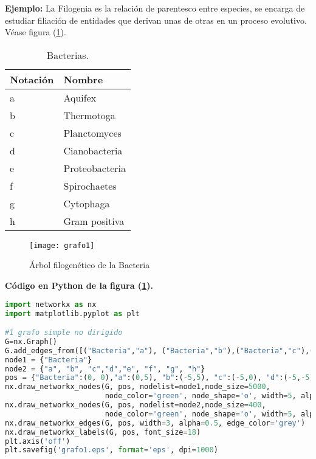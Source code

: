 \documentclass[a4paper, 11pt]{article}
\begin{document}
\textbf{Ejemplo:} La Filogenia es la relación de parentesco entre especies, se encarga de estudiar filiación de entidades que derivan unas de otras en un proceso evolutivo. Véase figura (\ref{imagen1}).


\begin{table}[H]
\begin{center}
\caption{Bacterias.}
\begin{tabular}{|l|l|}
\hline 
 Notación  &Nombre \\  \hline \hline
a &Aquifex  \\ \hline
b &Thermotoga\\ \hline
c  &Planctomyces \\ \hline
d  &Cianobacteria\\ \hline
e  &Proteobacteria \\ \hline
f  &Spirochaetes\\ \hline
g  & Cytophaga\\ \hline
h  & Gram positiva\\ \hline
\end{tabular}
\label{tabla1}
\end{center}
\end{table}

\begin{figure}[H]
  \centering
    \texttt{[image: grafo1]}
  \caption{Árbol filogenético de la Bacteria}
  \label{imagen1}
\end{figure}

\textbf{Código en Python de la figura (\ref{imagen1}).}
\begin{lstlisting}[language=Python]
import networkx as nx
import matplotlib.pyplot as plt

#1 grafo simple no dirigido
G=nx.Graph()
G.add_edges_from([("Bacteria","a"), ("Bacteria","b"),("Bacteria","c"),("Bacteria","d"),("Bacteria","e"),("Bacteria","f"),("Bacteria","g"),("Bacteria","h")])
node1 = {"Bacteria"}
node2 = {"a", "b", "c","d","e", "f", "g", "h"}
pos = {"Bacteria":(0, 0),"a":(0,5), "b":(-5,5), "c":(-5,0), "d":(-5,-5), "e":(0,-5), "f":(5,-5), "g":(5,0), "h":(5,5)}
nx.draw_networkx_nodes(G, pos, nodelist=node1,node_size=5000, 
                       node_color='green', node_shape='o', width=5, alpha=1)
nx.draw_networkx_nodes(G, pos, nodelist=node2,node_size=400, 
                       node_color='green', node_shape='o', width=5, alpha=1)
nx.draw_networkx_edges(G, pos, width=3, alpha=0.5, edge_color='grey')
nx.draw_networkx_labels(G, pos, font_size=18)
plt.axis('off')
plt.savefig('grafo1.eps', format='eps', dpi=1000)
\end{lstlisting}
\end{document}
